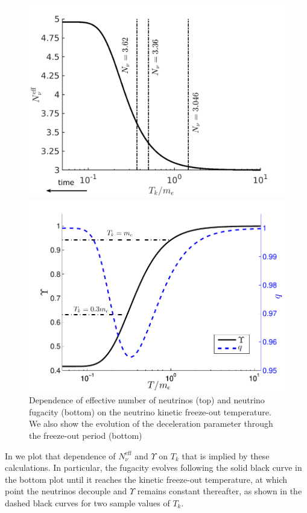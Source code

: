 \begin{figure}
\centerline{\includegraphics[width=0.90\linewidth]{04-birrell/ModelIndStudy/Figures/N_eff.pdf}}
\centerline{\includegraphics[width=0.90\linewidth]{04-birrell/ModelIndStudy/Figures/Upsilon_q.pdf}}
\caption{Dependence of effective number of neutrinos (top) and neutrino fugacity (bottom) on the neutrino kinetic freeze-out temperature. We also show the evolution of the deceleration parameter through the freeze-out period (bottom)}
\label{fig:Tk_dependence}
\end{figure}
 In  we plot that dependence of $N^{\mathrm{eff}}_\nu$ and $\Upsilon$ on $T_k$ that is implied by these calculations. In particular, the fugacity evolves following the solid black curve in the bottom plot until it reaches the kinetic freeze-out temperature, at which point the neutrinos decouple and $\Upsilon$ remains constant thereafter, as shown in the dashed black curves for two sample values of $T_k$. 
 

